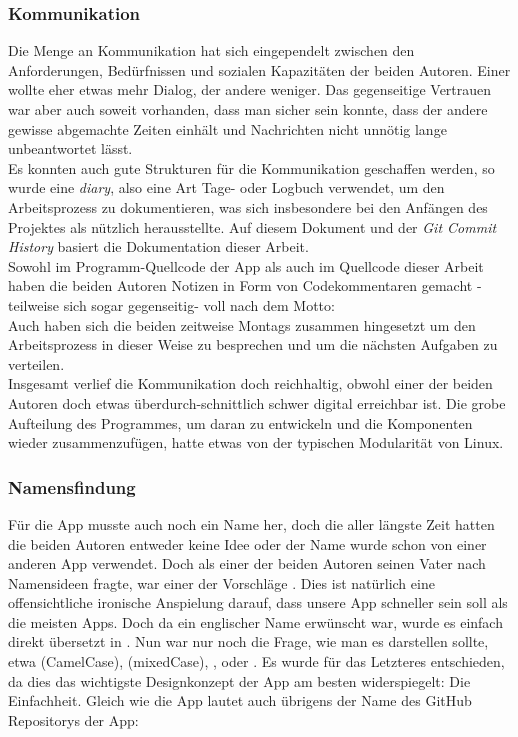 \documentclass[a4paper,11pt]{article}
\begin{document}
\subsubsection{Kommunikation}

Die Menge an Kommunikation hat sich eingependelt zwischen den Anforderungen, Bedürfnissen und sozialen Kapazitäten der beiden Autoren. Einer wollte eher etwas mehr Dialog, der andere weniger. Das gegenseitige Vertrauen war aber auch soweit vorhanden, dass man sicher sein konnte, dass der andere gewisse abgemachte Zeiten einhält und Nachrichten nicht unnötig lange unbeantwortet lässt.\\

Es konnten auch gute Strukturen für die Kommunikation geschaffen werden, so wurde eine \textit{diary}, also eine Art Tage- oder Logbuch verwendet, um den Arbeitsprozess zu dokumentieren, was sich insbesondere bei den Anfängen des Projektes als nützlich herausstellte. Auf diesem Dokument und der \textit{Git Commit History} basiert die Dokumentation dieser Arbeit.\\

Sowohl im Programm-Quellcode der App als auch im Quellcode dieser Arbeit haben die beiden Autoren Notizen in Form von Codekommentaren gemacht - teilweise sich sogar gegenseitig- voll nach dem Motto: \\

Auch haben sich die beiden zeitweise Montags zusammen hingesetzt um den Arbeitsprozess in dieser Weise zu besprechen und um die nächsten Aufgaben zu verteilen.\\

Insgesamt verlief die Kommunikation doch reichhaltig, obwohl einer der beiden Autoren doch etwas überdurch-schnittlich schwer digital erreichbar ist. Die grobe Aufteilung des Programmes, um daran zu entwickeln und die Komponenten wieder zusammenzufügen, hatte etwas von der typischen Modularität von Linux.

\subsubsection{Namensfindung}
Für die App musste auch noch ein Name her, doch die aller längste Zeit hatten die beiden Autoren entweder keine Idee oder der Name wurde schon von einer anderen App verwendet. Doch als einer der beiden Autoren seinen Vater nach Namensideen fragte, war einer der Vorschläge . Dies ist natürlich eine offensichtliche ironische Anspielung darauf, dass unsere App schneller sein soll als die meisten Apps. Doch da ein englischer Name erwünscht war, wurde es einfach direkt übersetzt in . Nun war nur noch die Frage, wie man es darstellen sollte, etwa  (CamelCase),  (mixedCase), ,  oder . Es wurde für das Letzteres entschieden, da dies das wichtigste Designkonzept der App am besten widerspiegelt: Die Einfachheit. Gleich wie die App lautet auch übrigens der Name des GitHub Repositorys der App:\\
\end{document}
